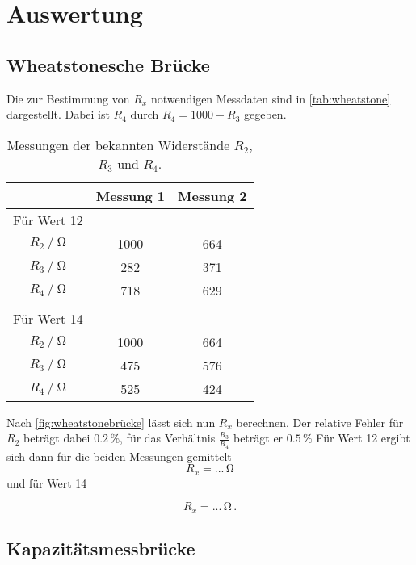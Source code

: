 \section{Auswertung}
\label{sec:Auswertung}

\subsection{Wheatstonesche Brücke}

Die zur Bestimmung von $R_x$ notwendigen Messdaten sind in \autoref{tab:wheatstone} dargestellt.
Dabei ist $R_4$ durch $R_4 = 1000 - R_3$ gegeben.

\begin{table}[H]
  \centering
  \caption{Messungen der bekannten Widerstände $R_2$, $R_3$ und $R_4$.}
  \label{tab:wheatstone}
  \begin{tabular}{S S S}
    \toprule
    & {Messung 1} & {Messung 2} \\
    \midrule
    {Für Wert 12} \\
    {$R_2 \mathbin{/} \unit{\ohm}$} & 1000 & 664 \\
    {$R_3 \mathbin{/} \unit{\ohm}$} &  282 & 371 \\
    {$R_4 \mathbin{/} \unit{\ohm}$} &  718 & 629 \\
    \\
    {Für Wert 14} \\ 
    {$R_2 \mathbin{/} \unit{\ohm}$} & 1000 & 664\\
    {$R_3 \mathbin{/} \unit{\ohm}$} &  475 & 576\\
    {$R_4 \mathbin{/} \unit{\ohm}$} &  525 & 424\\
    \bottomrule
  \end{tabular}
\end{table}

Nach \eqref{fig:wheatstonebrücke} lässt sich nun $R_x$ berechnen. 
Der relative Fehler für $R_2$ beträgt dabei $0.2 \,\%$, für das Verhältnis $\frac{R_3}{R_4}$ beträgt er $0.5 \,\%$
Für Wert 12 ergibt sich dann für die beiden Messungen gemittelt
\begin{equation*}
  R_x = ... \,\unit{\ohm}
\end{equation*} und für Wert 14

\begin{equation*}
  R_x = ... \,\unit{\ohm} \,.
\end{equation*}


\subsection{Kapazitätsmessbrücke}

